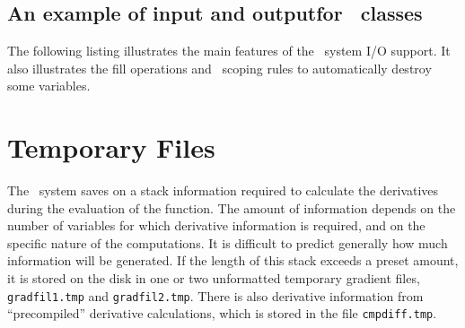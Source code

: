 \documentclass{admbmanual}
\begin{document}
\section{An example of input and output\br for \scAD\ classes}

The following listing illustrates the main features of the \scAD\ system
I/O support. It also illustrates the fill operations
and \cplus\ scoping rules to
automatically destroy some variables.




\chapter{Temporary Files}

The \scAD\ system saves on a stack information required to calculate the
derivatives during the evaluation of the function. 
The amount of information depends on the number of variables for which
derivative information is required, and on the specific nature of the
computations. It is difficult to predict generally how much information
will be generated. If the
length of this stack exceeds a preset amount, it is stored on the disk 
in one or two unformatted temporary gradient files, 
\texttt{gradfil1.tmp} and \texttt{gradfil2.tmp}. There is also
derivative information from ``precompiled'' derivative calculations,
which is stored in the file \texttt{cmpdiff.tmp}. 
\end{document}
